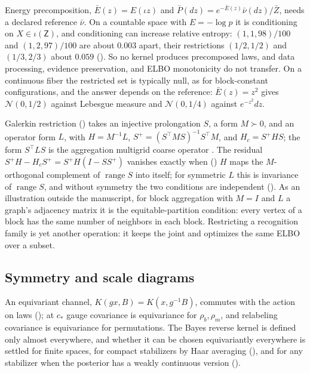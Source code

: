 Energy precomposition, $\bar E(z)=E(\iota z)$ and $\bar P(dz)=e^{-\bar E(z)}\bar\nu(dz)/\bar Z$, needs a
declared reference $\bar\nu$. On a countable space with $E=-\log p$ it is conditioning on
$X\in\iota(\mathsf Z)$, and conditioning can increase relative entropy: $(1,1,98)/100$ and
$(1,2,97)/100$ are about $0.003$ apart, their restrictions $(1/2,1/2)$ and $(1/3,2/3)$ about $0.059$
(). So no kernel produces precomposed laws, and data processing, evidence
preservation, and ELBO monotonicity do not transfer. On a continuous fiber the restricted set is
typically null, as for block-constant configurations, and the answer depends on the reference:
$\bar E(z)=z^2$ gives $\mathcal N(0,1/2)$ against Lebesgue measure and $\mathcal N(0,1/4)$ against
$e^{-z^2}dz$.

Galerkin restriction () takes an injective prolongation $S$, a form $M\succ0$,
and an operator form $L$, with $H=M^{-1}L$, $S^+=(S^\top MS)^{-1}S^\top M$, and $H_c=S^+HS$; the form
$S^\top LS$ is the aggregation multigrid coarse operator \citep{Notay2010Aggregation}. The residual
$S^+H-H_cS^+=S^+H(I-SS^+)$ vanishes exactly when () $H$ maps the
$M$-orthogonal complement of $\operatorname{range}S$ into itself; for symmetric $L$ this is invariance of
$\operatorname{range}S$, and without symmetry the two conditions are independent
(). As an illustration outside the manuscript, for block aggregation
with $M=I$ and $L$ a graph's adjacency matrix it is the equitable-partition condition: every vertex of a
block has the same number of neighbors in each block. Restricting a recognition family is yet another
operation: it keeps the joint and optimizes the same ELBO over a subset.

\subsection{Symmetry and scale diagrams}

An equivariant channel, $K(gx,B)=K(x,g^{-1}B)$, commutes with the action on laws
(); at $c_*$ gauge covariance is equivariance for $\rho_b,\rho_m$, and
relabeling covariance is equivariance for permutations. The Bayes reverse kernel is defined only almost
everywhere, and whether it can be chosen equivariantly everywhere is settled for finite spaces, for
compact stabilizers by Haar averaging (), and for any stabilizer
when the posterior has a weakly continuous version ().

